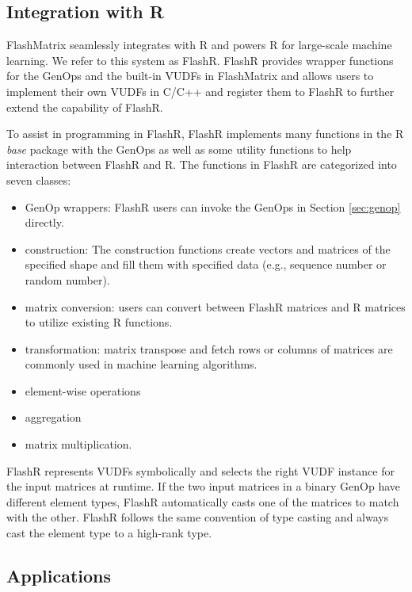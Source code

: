 \subsection{Integration with R}

FlashMatrix seamlessly integrates with R and powers R for large-scale machine
learning. We refer to this system as FlashR. FlashR provides wrapper functions
for the GenOps and the built-in VUDFs in FlashMatrix and allows users to
implement their own VUDFs in C/C++ and register them to FlashR to further
extend the capability of FlashR.

To assist in programming in FlashR, FlashR implements many functions in
the R \textit{base} package with the GenOps as well as some utility functions
to help interaction between FlashR and R. The functions in FlashR are categorized
into seven classes:
\begin{itemize}
	\item GenOp wrappers: FlashR users can invoke the GenOps in Section
		\ref{sec:genop} directly.
	\item construction: The construction functions create vectors and matrices
		of the specified shape and fill them with specified data (e.g.,
		sequence number or random number).
	\item matrix conversion: users can convert between FlashR matrices and
		R matrices to utilize existing R functions.
	\item transformation: matrix transpose and fetch rows or columns of matrices
		are commonly used in machine learning algorithms.
	\item element-wise operations
	\item aggregation
	\item matrix multiplication.
\end{itemize}


FlashR represents VUDFs symbolically and selects the right VUDF instance for
the input matrices at runtime. If the two input matrices in a binary GenOp have
different element types, FlashR automatically casts one of the matrices to
match with the other. FlashR follows the same convention of type casting and
always cast the element type to a high-rank type.

\subsection{Applications}

